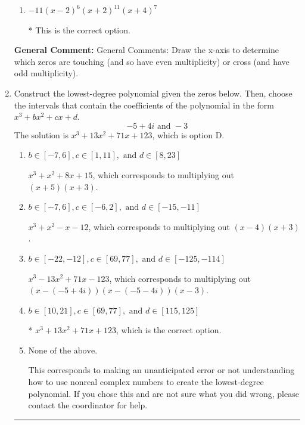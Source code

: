 \documentclass{extbook}[14pt]
\newcommand{\litem}[1]{\item #1

\rule{\textwidth}{0.4pt}}
\begin{document}
\begin{enumerate}
{\begin{enumerate}[label=\Alph*.]
The factor $2$ should have an even power and the factor $-2$ should have an odd power.
\item \( -11(x - 2)^{6} (x + 2)^{11} (x + 4)^{7} \)

* This is the correct option.
\end{enumerate}

\textbf{General Comment:} General Comments: Draw the x-axis to determine which zeros are touching (and so have even multiplicity) or cross (and have odd multiplicity).
}
\litem{
Construct the lowest-degree polynomial given the zeros below. Then, choose the intervals that contain the coefficients of the polynomial in the form $x^3+bx^2+cx+d$.
\[ -5 + 4 i \text{ and } -3 \]The solution is \( x^{3} +13 x^{2} +71 x + 123 \), which is option D.\begin{enumerate}[label=\Alph*.]
\item \( b \in [-7, 6], c \in [1, 11], \text{ and } d \in [8, 23] \)

$x^{3} + x^{2} +8 x + 15$, which corresponds to multiplying out $(x + 5)(x + 3)$.
\item \( b \in [-7, 6], c \in [-6, 2], \text{ and } d \in [-15, -11] \)

$x^{3} + x^{2} -x -12$, which corresponds to multiplying out $(x -4)(x + 3)$.
\item \( b \in [-22, -12], c \in [69, 77], \text{ and } d \in [-125, -114] \)

$x^{3} -13 x^{2} +71 x -123$, which corresponds to multiplying out $(x-(-5 + 4 i))(x-(-5 - 4 i))(x -3)$.
\item \( b \in [10, 21], c \in [69, 77], \text{ and } d \in [115, 125] \)

* $x^{3} +13 x^{2} +71 x + 123$, which is the correct option.
\item \( \text{None of the above.} \)

This corresponds to making an unanticipated error or not understanding how to use nonreal complex numbers to create the lowest-degree polynomial. If you chose this and are not sure what you did wrong, please contact the coordinator for help.
\end{enumerate}

}
\end{enumerate}
\end{document}
